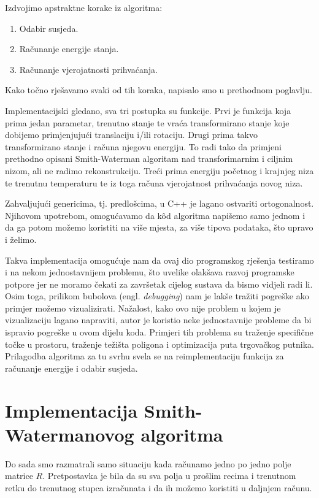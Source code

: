 \documentclass[times, utf8, zavrsni]{fer}
\begin{document}
Izdvojimo apstraktne korake iz algoritma:
\begin{enumerate}
\item 
Odabir susjeda.

\item
Računanje energije stanja.

\item
Računanje vjerojatnosti prihvaćanja.
\end{enumerate}
Kako točno rješavamo svaki od tih koraka, napisalo smo u
prethodnom poglavlju. 

Implementacijski gledano, sva tri postupka su funkcije.
Prvi je funkcija koja prima jedan parametar, trenutno stanje
te vraća transformirano stanje koje dobijemo primjenjujući
translaciju i/ili rotaciju.
Drugi prima takvo transformirano stanje i računa njegovu
energiju. To radi tako da primjeni prethodno opisani
Smith-Waterman algoritam nad transforimarnim i ciljnim
nizom, ali ne radimo rekonstrukciju. 
Treći prima energiju početnog i krajnjeg niza te trenutnu
temperaturu te iz toga računa vjerojatnost prihvaćanja
novog niza. 

Zahvaljujući genericima, tj. predlošcima, u C++ je lagano
ostvariti ortogonalnost. Njihovom upotrebom, omogućavamo
da kôd algoritma napišemo samo jednom i da ga potom možemo
koristiti na više mjesta, za više tipova podataka,
što upravo i želimo. 

Takva implementacija omogućuje nam da ovaj dio programskog
rješenja testiramo i na nekom jednostavnijem problemu, što
uvelike olakšava razvoj programske potpore jer ne moramo
čekati za završetak cijelog sustava da bismo vidjeli radi li.
Osim toga, prilikom bubolova (engl. \textit{debugging}) nam
je lakše tražiti pogreške ako primjer možemo vizualizirati.
Nažalost, kako ovo nije problem u kojem je vizualizaciju
lagano napraviti, autor je koristio neke jednostavnije
probleme da bi ispravio pogreške u ovom dijelu koda. Primjeri
tih problema su traženje specifične točke u prostoru, 
traženje težišta poligona i optimizacija puta trgovačkog putnika. 
Prilagodba algoritma za tu svrhu svela se na reimplementaciju
funkcija za računanje energije i odabir susjeda. 


\section{Implementacija Smith-Watermanovog algoritma}
Do sada smo razmatrali samo situaciju kada računamo jedno
po jedno polje matrice $R$. Pretpostavka je bila da su 
sva polja u prošlim recima i trenutnom retku do trenutnog
stupca izračunata i da ih možemo koristiti u daljnjem
računu. 
\end{document}
